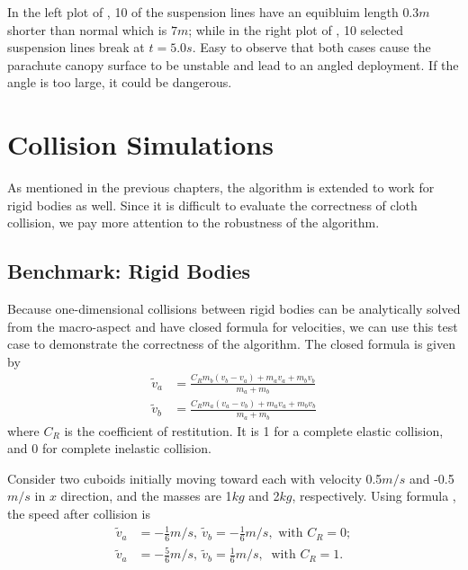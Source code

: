 In the left plot of , 10 of the suspension lines have an
equibluim length $0.3 m$ shorter than normal which is $7 m$; while in the
right plot of , 10 selected suspension lines break at
$t = 5.0s$.
Easy to observe that both cases cause the parachute canopy surface to be
unstable and lead to an angled deployment.
If the angle is too large, it could be dangerous.



\section{Collision Simulations}
As mentioned in the previous chapters, the algorithm is extended to
work for rigid bodies as well.
Since it is difficult to evaluate the correctness of cloth collision, we pay
more attention to the robustness of the algorithm.

\subsection{Benchmark: Rigid Bodies}
Because one-dimensional collisions between rigid bodies can be analytically
solved from the macro-aspect and have closed formula for velocities, we can
use this test case to demonstrate the correctness of the algorithm.
The closed formula is given by
\begin{equation}
\begin{aligned}
\widetilde{v}_a &= \frac{C_R m_b(v_b-v_a)+m_a v_a+m_b v_b}{m_a+m_b} \\
\widetilde{v}_b &= \frac{C_R m_a(v_a-v_b)+m_a v_a+m_b v_b}{m_a+m_b}
\end{aligned}
\label{eqn:rg_collsn_velo}
\end{equation}
where $C_R$ is the coefficient of restitution.
It is 1 for a complete elastic collision, and 0 for complete inelastic
collision.

Consider two cuboids initially moving toward each with velocity 0.5$m/s$ and
-0.5$m/s$ in $x$ direction, and the masses are 1$kg$ and 2$kg$, respectively.
Using formula , the speed after collision is
\begin{equation}
\begin{aligned}
\widetilde{v}_a &= -\frac{1}{6} m/s,\ 
\widetilde{v}_b = -\frac{1}{6} m/s, \mbox{ with $C_R = 0$}; \\
\widetilde{v}_a &= -\frac{5}{6} m/s,\ 
\widetilde{v}_b = \frac{1}{6} m/s,\ \mbox{ with $C_R = 1$}.
\end{aligned}
\end{equation}


